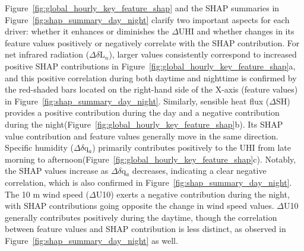 Figure~\ref{fig:global_hourly_key_feature_shap} and the SHAP summaries in Figure~\ref{fig:shap_summary_day_night}  clarify two important aspects for each driver: whether it enhances or diminishes the \ensuremath{\Delta }UHI and whether changes in its feature values positively or negatively correlate with the SHAP contribution. For net infrared radiation (\ensuremath{\Delta }\ensuremath{\delta }L\ensuremath{_{n}}), larger values consistently correspond to increased positive SHAP contributions in Figure~\ref{fig:global_hourly_key_feature_shap}a, and this positive correlation during both daytime and nighttime is confirmed by the red-shaded bars located on the right-hand side of the X-axis (feature values) in Figure~\ref{fig:shap_summary_day_night}. Similarly, sensible heat flux (\ensuremath{\Delta }SH) provides a positive contribution during the day and a negative contribution during the night(Figure~\ref{fig:global_hourly_key_feature_shap}b). Its SHAP value contribution and feature values generally move in the same direction. Specific humidity (\ensuremath{\Delta }\ensuremath{\delta }q\ensuremath{_{a}}) primarily contributes positively to the UHI from late morning to afternoon(Figure~\ref{fig:global_hourly_key_feature_shap}c). Notably, the SHAP values increase as \ensuremath{\Delta }\ensuremath{\delta }q\ensuremath{_{a}} decreases, indicating a clear negative correlation, which is also confirmed in Figure~\ref{fig:shap_summary_day_night}. The 10 m wind speed (\ensuremath{\Delta }U10) exerts a negative contribution during the night, with SHAP contributions going opposite the change in wind speed values. \ensuremath{\Delta }U10 generally contributes positively during the daytime, though the correlation between feature values and SHAP contribution is less distinct, as observed in Figure~\ref{fig:shap_summary_day_night}  as well. 


